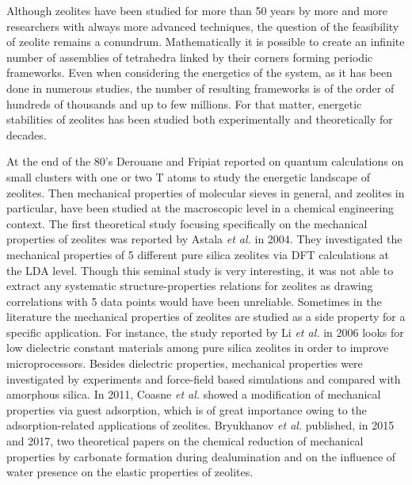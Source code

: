 \documentclass[journal=jacsat,manuscript=article]{achemso}
\begin{document}
Although zeolites have been studied for more than 50 years by more and more researchers with always more advanced techniques, the question of the feasibility of zeolite remains a conundrum. Mathematically it is possible to create an infinite number of assemblies of tetrahedra linked by their corners forming periodic frameworks.\cite{Treacy1997768} Even when considering the energetics of the system, as it has been done in numerous studies, the number of resulting frameworks is of the order of hundreds of thousands and up to few millions.\cite{woodley_crystal_2008,friedrichs_systematic_1999,treacy_enumeration_2004} For that matter, energetic stabilities of zeolites has been studied both experimentally and theoretically for decades.

At the end of the 80's Derouane and Fripiat\cite{derouane_quantum_1987} reported on quantum calculations on small clusters with one or two T atoms to study the energetic landscape of zeolites. Then mechanical properties of molecular sieves in general, and zeolites in particular, have been studied at the macroscopic level in a chemical engineering context.\cite{kosanovic_mechanochemistry_1995,obrien-abraham_comparative_2007} The first theoretical study focusing specifically on the mechanical properties of zeolites was reported by Astala \emph{et al.} in 2004.\cite{astala_density_2004} They investigated the mechanical properties of 5 different pure silica zeolites via DFT calculations at the LDA level. Though this seminal study is very interesting, it was not able to extract any systematic structure-properties relations for zeolites as drawing correlations with 5 data points would have been unreliable. Sometimes in the literature the mechanical properties of zeolites are studied as a side property for a specific application. For instance, the study reported by Li \emph{et al.} in 2006\cite{li_mechanical_2006} looks for low dielectric constant materials among pure silica zeolites in order to improve microprocessors. Besides dielectric properties, mechanical properties were investigated by experiments and force-field based simulations and compared with amorphous silica. In 2011, Coasne \emph{et al.} showed a modification of mechanical properties via guest adsorption\cite{coasne_enhanced_2011}, which is of great importance owing to the adsorption-related applications of zeolites. Bryukhanov \emph{et al.} published, in 2015 and 2017, two theoretical papers on the chemical reduction of mechanical properties by carbonate formation during dealumination\cite{bryukhanov_chemical_2015} and on the influence of water presence on the elastic properties of zeolites.\cite{bryukhanov_role_2017} 
\end{document}
